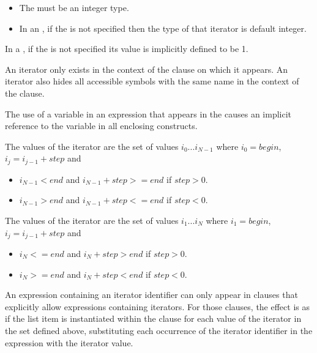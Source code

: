 
\begin{fortranspecific}
\begin{itemize}
\item The  must be an integer type.
\item In an , if the  is not specified then the type of that iterator is default integer.
\end{itemize}
\end{fortranspecific}

In a , if the  is not specified its value is implicitly defined to be 1.

An iterator only exists in the context of the clause on which it appears. An iterator also hides all accessible symbols with the same name in the context of the clause.

The use of a variable in an expression that appears in the  causes an implicit reference to the variable in all enclosing constructs.

\begin{ccppspecific}
The values of the iterator are the set of values $i_{0}$...$i_{N-1}$ where $i_{0}=begin$,  $i_{j}=i_{j-1} + step$ and
\begin{itemize}
\item $i_{N-1} < end$ and $i_{N-1} + step >= end$ if $step > 0$.
\item $i_{N-1} > end$ and $i_{N-1} + step <= end$ if $step < 0$.
\end{itemize}
\end{ccppspecific}
\begin{fortranspecific}
The values of the iterator are the set of values $i_{1}$...$i_{N}$ where $i_{1}=begin$,  $i_{j}=i_{j-1} + step$ and
\begin{itemize}
\item $i_{N} <= end$ and $i_{N} + step > end$ if $step > 0$.
\item $i_{N} >= end$ and $i_{N} + step < end$ if $step < 0$.
\end{itemize}
\end{fortranspecific}

An expression containing an iterator identifier can only appear in clauses that
explicitly allow expressions containing iterators. For those clauses, the
effect is as if the list item is instantiated within the clause for each
value of the iterator in the set defined above, substituting each occurrence of
the iterator identifier in the expression with the iterator value.

